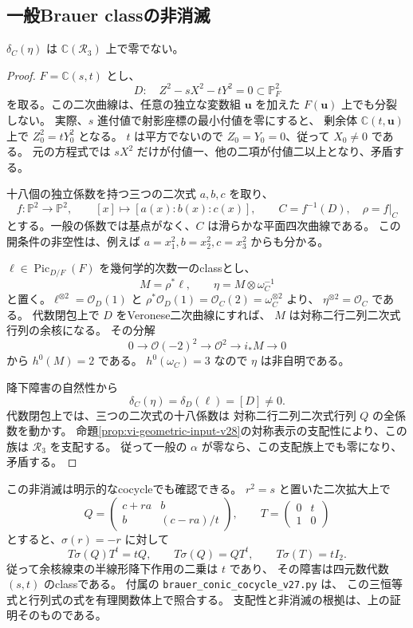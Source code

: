 \subsection{一般Brauer classの非消滅}
\begin{lemma}[非分裂二次曲線からの支配族]
\label{lem:prym-brauer-nonzero-v27}
$\delta_C(\eta)$ は $\mathbb C(\mathcal R_3)$ 上で零でない。
\end{lemma}

\begin{proof}
$F=\mathbb C(s,t)$ とし、
\[
 D:\quad Z^2-sX^2-tY^2=0\subset\mathbb P^2_F
\]
を取る。この二次曲線は、任意の独立な変数組 $\mathbf u$ を加えた
$F(\mathbf u)$ 上でも分裂しない。
実際、$s$ 進付値で射影座標の最小付値を零にすると、
剰余体 $\mathbb C(t,\mathbf u)$ 上で $Z_0^2=tY_0^2$ となる。
$t$ は平方でないので $Z_0=Y_0=0$、従って $X_0\ne0$ である。
元の方程式では $sX^2$ だけが付値一、他の二項が付値二以上となり、矛盾する。

十八個の独立係数を持つ三つの二次式 $a,b,c$ を取り、
\[
 f:\mathbb P^2\longrightarrow\mathbb P^2,
 \qquad [x]\longmapsto[a(x):b(x):c(x)],
 \qquad C=f^{-1}(D),\quad\rho=f|_C
\]
とする。一般の係数では基点がなく、$C$ は滑らかな平面四次曲線である。
この開条件の非空性は、例えば $a=x_1^2,b=x_2^2,c=x_3^2$ からも分かる。

$\ell\in\operatorname{Pic}_{D/F}(F)$ を幾何学的次数一のclassとし、
\[
 M=\rho^*\ell,
 \qquad \eta=M\otimes\omega_C^{-1}
\]
と置く。$\ell^{\otimes2}=\mathcal O_D(1)$ と
$\rho^*\mathcal O_D(1)=\mathcal O_C(2)=\omega_C^{\otimes2}$ より、
$\eta^{\otimes2}=\mathcal O_C$ である。
代数閉包上で $D$ をVeronese二次曲線にすれば、
$M$ は対称二行二列二次式行列の余核になる。
その分解
\[
 0\longrightarrow\mathcal O(-2)^2
 \longrightarrow\mathcal O^2\longrightarrow i_*M\longrightarrow0
\]
から $h^0(M)=2$ である。
$h^0(\omega_C)=3$ なので $\eta$ は非自明である。

降下障害の自然性から
\[
 \delta_C(\eta)=\delta_D(\ell)=[D]\ne0.
\]
代数閉包上では、三つの二次式の十八係数は
対称二行二列二次式行列 $Q$ の全係数を動かす。
命題\ref{prop:vi-geometric-input-v28}の対称表示の支配性により、この族は
$\mathcal R_3$ を支配する。
従って一般の $\alpha$ が零なら、この支配族上でも零になり、矛盾する。
\end{proof}

この非消滅は明示的なcocycleでも確認できる。
$r^2=s$ と置いた二次拡大上で
\[
 Q=\begin{pmatrix}c+ra&b\\ b&(c-ra)/t\end{pmatrix},
 \qquad T=\begin{pmatrix}0&t\\1&0\end{pmatrix}
\]
とすると、$\sigma(r)=-r$ に対して
\[
 T\sigma(Q)T^t=tQ,\qquad T\sigma(Q)=QT^t,
 \qquad T\sigma(T)=tI_2.
\]
従って余核線束の半線形降下作用の二乗は $t$ であり、
その障害は四元数代数 $(s,t)$ のclassである。
付属の \nolinkurl{brauer_conic_cocycle_v27.py} は、
この三恒等式と行列式の式を有理関数体上で照合する。
支配性と非消滅の根拠は、上の証明そのものである。


